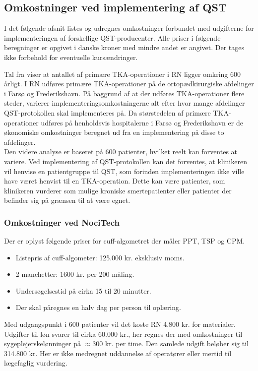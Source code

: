 \subsection{Omkostninger ved implementering af QST}
I det følgende afsnit listes og udregnes omkostninger forbundet med udgifterne for implementeringen af forskellige QST-producenter. Alle priser i følgende beregninger er opgivet i danske kroner med mindre andet er angivet. Der tages ikke forbehold for eventuelle kursændringer. 

Tal fra  viser at antallet af primære TKA-operationer i RN ligger omkring 600 årligt. \citep{aarsrapport2016} I RN udføres primære TKA-operationer på de ortopædkirurgiske afdelinger i Farsø og Frederikshavn. På baggrund af at der udføres TKA-operationer flere steder, varierer implementeringsomkostningerne alt efter hvor mange afdelinger QST-protokollen skal implementeres på. Da størstedelen af primære TKA-operationer udføres på henholdsvis hospitalerne i Farsø og Frederikshavn er de økonomiske omkostninger beregnet ud fra en implementering på disse to afdelinger. \\
Den videre analyse er baseret på 600 patienter, hvilket reelt kan forventes at variere. Ved implementering af QST-protokollen kan det forventes, at klinikeren vil henvise en patientgruppe til QST, som forinden implementeringen ikke ville have været henvist til en TKA-operation. Dette kan være patienter, som klinikeren vurderer som mulige kroniske smertepatienter eller patienter der befinder sig på grænsen til at være egnet. 

\subsubsection{Omkostninger ved NociTech}
Der er oplyst følgende priser for cuff-algometret der måler PPT, TSP og CPM.
\begin{itemize} 
\item Listepris af cuff-algometer: 125.000 kr. eksklusiv moms.
\item 2 manchetter: 1600 kr. per 200 måling.
\item Undersøgelsestid på cirka 15 til 20 minutter.
\item Der skal påregnes en halv dag per person til oplæring.
\end{itemize}

Med udgangspunkt i 600 patienter vil det koste RN 4.800 kr. for materialer. Udgifter til løn svarer til cirka 60.000 kr., her regnes der med omkostninger til sygeplejerskelønninger på $\approx 300$ kr. per time. \citep{DST1} \citep{DTS2} Den samlede udgift beløber sig til 314.800 kr. Her er ikke medregnet uddannelse af operatører eller mertid til lægefaglig vurdering.

